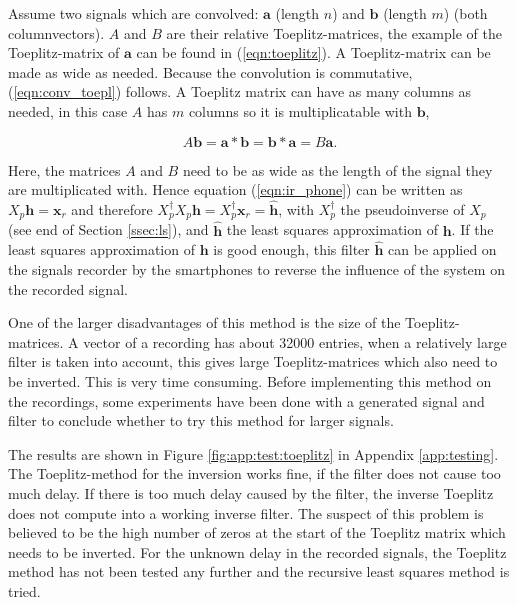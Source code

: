 Assume two signals which are convolved: $\mathbf{a}$ (length $n$) and $\mathbf{b}$ (length $m$) (both columnvectors).
$A$ and $B$ are their relative Toeplitz-matrices, the example of the Toeplitz-matrix of $ \mathbf{a}$ can be found in (\ref{eqn:toeplitz}).
A Toeplitz-matrix can be made as wide as needed.
Because the convolution is commutative, (\ref{eqn:conv_toepl}) follows.
A Toeplitz matrix can have as many columns as needed, in this case $A$ has $m$ columns so it is multiplicatable with $\mathbf{b}$,

\begin{equation}
\label{eqn:conv_toepl}
A\mathbf{b}=\mathbf{a}*\mathbf{b}=\mathbf{b}*\mathbf{a}=B\mathbf{a}.
\end{equation}

Here, the matrices $A$ and $B$ need to be as wide as the length of the signal they are multiplicated with.
Hence equation (\ref{eqn:ir_phone}) can be written as $X_p\mathbf{h}=\mathbf{x}_r$ and therefore $X_p^{\dagger}X_p\mathbf{h}=X_p^{\dagger}\mathbf{x}_r=\hat{\mathbf{h}}$, with $X_p^\dagger$ the pseudoinverse of $X_p$ (see end of Section \ref{ssec:ls}), and $\hat{\mathbf{h}}$ the least squares approximation of $\mathbf{h}$. If the least squares approximation of $\mathbf{h}$ is good enough, this filter $\hat{\mathbf{h}}$ can be applied on the signals recorder by the smartphones to reverse the influence of the system on the recorded signal.

One of the larger disadvantages of this method is the size of the Toeplitz-matrices.
A vector of a recording has about 32000 entries, when a relatively large filter is taken into account, this gives large Toeplitz-matrices which also need to be inverted.
This is very time consuming.
Before implementing this method on the recordings, some experiments have been done with a {\matlab} generated signal and filter to conclude whether to try this method for larger signals.

The results are shown in Figure \ref{fig:app:test:toeplitz} in Appendix \ref{app:testing}.
The Toeplitz-method for the inversion works fine, if the filter does not cause too much delay.
If there is too much delay caused by the filter, the inverse Toeplitz does not compute into a working inverse filter.
The suspect of this problem is believed to be the high number of zeros at the start of the Toeplitz matrix which needs to be inverted.
For the unknown delay in the recorded signals, the Toeplitz method has not been tested any further and the recursive least squares method is tried.

